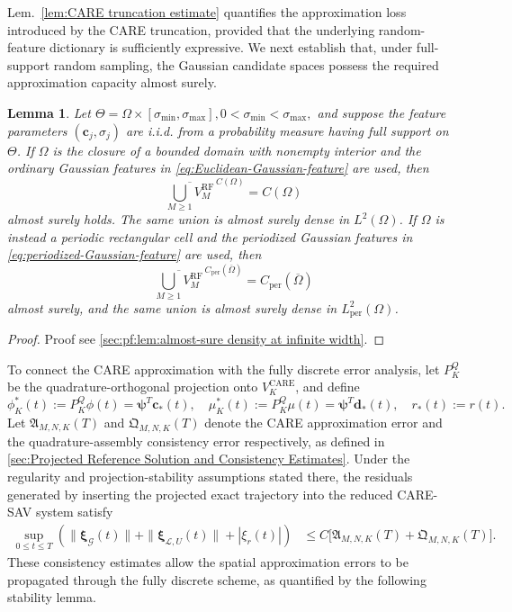 \documentclass[10pt,reqno]{amsart}
\newtheorem{lmm}{\bf Lemma}
\newenvironment{lemma}{\begin{lmm}}{\end{lmm}}
\theoremstyle{remark}
\theoremstyle{definition}
\begin{document}
Lem.~\ref{lem:CARE truncation estimate} quantifies the approximation loss introduced by the CARE truncation, provided that the underlying random-feature dictionary is sufficiently expressive. We next establish that, under full-support random sampling, the Gaussian candidate spaces possess the required approximation capacity almost surely.

\begin{lemma}
\label{lem:almost-sure density at infinite width}
  Let $\Theta=\Omega\times[\sigma_{\min},\sigma_{\max}], 0<\sigma_{\min}<\sigma_{\max},$ and suppose the feature parameters $(\boldsymbol c_j,\sigma_j)$ are i.i.d. from a probability measure having full support on $\Theta$. If $\Omega$ is the closure of a bounded domain with nonempty interior and the ordinary Gaussian features in \eqref{eq:Euclidean-Gaussian-feature} are used, then
  \begin{equation}
    \overline{\bigcup_{M\ge1}V_M^{\mathrm{RF}}}^{\,C(\Omega)}=C(\Omega)
  \end{equation}
  almost surely holds. The same union is almost surely dense in $L^2(\Omega)$. If $\Omega$ is instead a periodic rectangular cell and the periodized Gaussian features in \eqref{eq:periodized-Gaussian-feature} are used, then
  \begin{equation}
    \overline{\bigcup_{M\ge1}V_M^{\mathrm{RF}}}^{\,C_{\mathrm{per}}(\overline\Omega)}
    =C_{\mathrm{per}}(\overline\Omega)
  \end{equation}
  almost surely, and the same union is almost surely dense in $L^2_{\mathrm{per}}(\Omega)$.
\end{lemma}
\begin{proof}
  Proof see \cref{sec:pf:lem:almost-sure density at infinite width}.
\end{proof}

To connect the CARE approximation with the fully discrete error analysis, let $P_K^Q$ be the quadrature-orthogonal projection onto $V_K^{\mathrm{CARE}}$, and define
$$
\phi_K^*(t):=P_K^Q\phi(t)=\boldsymbol\psi^{T}\boldsymbol c_*(t),
\quad
\mu_K^*(t):=P_K^Q\mu(t)=\boldsymbol\psi^{T}\boldsymbol d_*(t),
\quad
r_*(t):=r(t).
$$
Let $\mathfrak A_{M,N,K}(T)$ and $\mathfrak Q_{M,N,K}(T)$ denote the CARE approximation error and the quadrature-assembly consistency error respectively, as defined in \cref{sec:Projected Reference Solution and Consistency Estimates}. Under the regularity and projection-stability assumptions stated there, the residuals generated by inserting the projected exact trajectory into the reduced CARE-SAV system satisfy
\begin{equation}
  \begin{aligned}
    \sup_{0\le t\le T}\left(
    \|\boldsymbol\xi_{\mathcal G}(t)\|+\|\boldsymbol\xi_{\mathcal L,U}(t)\|+|\xi_r(t)|
    \right)
    &\le C\bigl[\mathfrak A_{M,N,K}(T)+\mathfrak Q_{M,N,K}(T)\bigr].
  \end{aligned}
\end{equation}
These consistency estimates allow the spatial approximation errors to be propagated through the fully discrete scheme, as quantified by the following stability lemma.
\end{document}
